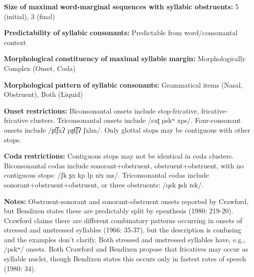 \begin{styleBody}
\textbf{Size} \textbf{of} \textbf{maximal} \textbf{word{}-marginal sequences with syllabic obstruents:} 5 (initial), 3 (final)
\end{styleBody}

\begin{styleBody}
\textbf{Predictability} \textbf{of} \textbf{syllabic} \textbf{consonants:} Predictable from word/consonantal context
\end{styleBody}

\begin{styleBody}
\textbf{Morphological} \textbf{constituency} \textbf{of} \textbf{maximal} \textbf{syllable} \textbf{margin:} Morphologically Complex (Onset, Coda)
\end{styleBody}

\begin{styleBody}
\textbf{Morphological} \textbf{pattern} \textbf{of} \textbf{syllabic} \textbf{consonants:} Grammatical items (Nasal, Obstruent), Both (Liquid)
\end{styleBody}

\begin{styleBody}
\textbf{Onset} \textbf{restrictions:} Biconsonantal onsets include stop-fricative, fricative-fricative clusters. Triconsonantal onsets include /sxʈ pskʷ xps/. Four-consonant onsets include /ʂt͡ʃxʔ pʂt͡ʃʔ ʃxlm/. Only glottal stops may be contiguous with other stops.
\end{styleBody}

\begin{styleBody}
\textbf{Coda} \textbf{restrictions:} Contiguous stops may not be identical in coda clusters. Biconsonantal codas include sonorant+obstruent, obstruent+obstruent, with no contiguous stops: /ʃk ʂx kp lp nʲx ms/. Triconsonantal codas include sonorant+obstruent+obstruent, or three obstruents: /qsk ʂsk ɾsk/.
\end{styleBody}

\begin{styleBody}
\textbf{Notes:} Obstruent-sonorant and sonorant-obstruent onsets reported by Crawford, but Bendixen states these are predictably split by epenthesis (1980: 219-20). Crawford claims there are different combinatory patterns occurring in onsets of stressed and unstressed syllables (1966: 35-37), but the description is confusing and the examples don’t clarify. Both stressed and unstressed syllables have, e.g., /pskʷ/ onsets. Both Crawford and Bendixen propose that fricatives may occur as syllable nuclei, though Bendixen states this occurs only in fastest rates of speech (1980: 34).
\end{styleBody}

